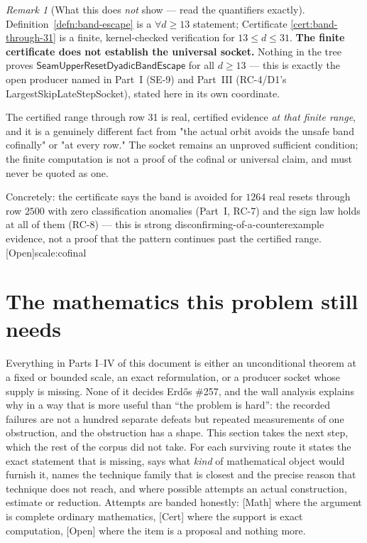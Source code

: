 \documentclass[11pt]{article}
\theoremstyle{plain}
\theoremstyle{definition}
\theoremstyle{remark}
\newtheorem{rem}[thm]{Remark}
\newcommand{\ev}[1]{{\small\textsf{[#1]}}\xspace}
\newcommand{\scale}[1]{{\small\textsf{scale:#1}}\xspace}
\begin{document}
\begin{rem}[What this does \emph{not} show — read the quantifiers exactly]
\label{rem:band-caveat}
Definition~\ref{defn:band-escape} is a $\forall d\ge13$ statement; Certificate
\ref{cert:band-through-31} is a finite, kernel-checked verification for $13\le d\le31$. \textbf{The
finite certificate does not establish the universal socket.} Nothing in the tree proves
$\mathsf{SeamUpperResetDyadicBandEscape}$ for all $d\ge13$ — this is exactly the open producer named
in Part~I (SE-9) and Part~III (RC-4/D1's \textsf{LargestSkipLateStepSocket}), stated here in its own
coordinate.

\par\medskip

The certified range through row 31 is real, certified evidence \emph{at that finite
range}, and it is a genuinely different fact from "the actual orbit avoids the unsafe band
cofinally" or "at every row." The socket remains an unproved sufficient condition; the finite
computation is not a proof of the cofinal or universal claim, and must never be quoted as one.

\par\medskip

Concretely: the certificate says the band is avoided for $1264$ real resets through row $2500$ with
zero classification anomalies (Part~I, RC-7) and the sign law holds at all of them (RC-8) — this is
strong disconfirming-of-a-counterexample evidence, not a proof that the pattern continues past the
certified range.
\ev{Open}\scale{cofinal}
\end{rem}
\section{The mathematics this problem still needs}
\label{sec:invent-257}

Everything in Parts I--IV of this document is either an unconditional theorem at a fixed or
bounded scale, an exact reformulation, or a producer socket whose supply is missing. None of it
decides Erd\H{o}s \#257, and the wall analysis explains why in a way that is more useful than
``the problem is hard'': the recorded failures are not a hundred separate defeats but repeated
measurements of one obstruction, and the obstruction has a shape. This section takes the next
step, which the rest of the corpus did not take. For each surviving route it states the exact
statement that is missing, says what \emph{kind} of mathematical object would furnish it, names
the technique family that is closest and the precise reason that technique does not reach, and
where possible attempts an actual construction, estimate or reduction. Attempts are banded
honestly: \ev{Math} where the argument is complete ordinary mathematics, \ev{Cert} where the
support is exact computation, \ev{Open} where the item is a proposal and nothing more.
\end{document}
